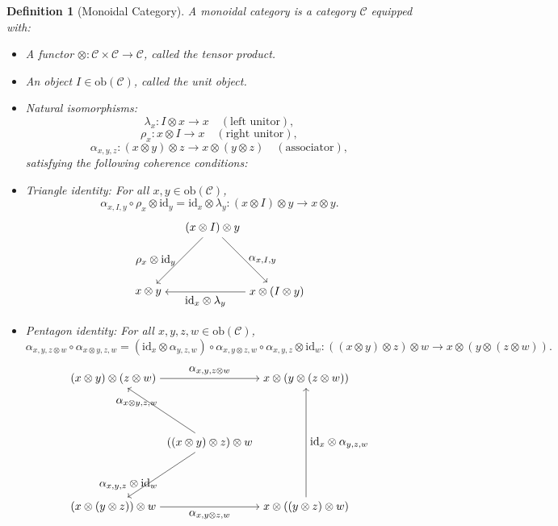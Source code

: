 \documentclass{article}
\theoremstyle{plain}
\newtheorem{definition}[theorem]{Definition}
\theoremstyle{remark}
\begin{document}
\begin{definition}[Monoidal Category]
A \emph{monoidal category} is a category $\mathcal{C}$ equipped with:
\begin{itemize}
    \item A functor $\otimes : \mathcal{C} \times \mathcal{C} \to \mathcal{C}$, called the tensor product.
    \item An object $I \in \mathrm{ob}(\mathcal{C})$, called the unit object.
    \item Natural isomorphisms:
    \[
    \lambda_x : I \otimes x \to x \quad (\text{left unitor}),
    \]
    \[
    \rho_x : x \otimes I \to x \quad (\text{right unitor}),
    \]
    \[
    \alpha_{x,y,z} : (x \otimes y) \otimes z \to x \otimes (y \otimes z) \quad (\text{associator}),
    \]
    satisfying the following coherence conditions:
    \item \emph{Triangle identity}: For all $x, y \in \mathrm{ob}(\mathcal{C})$,
    \[
    \alpha_{x,I,y} \circ \rho_x \otimes \mathrm{id}_y = \mathrm{id}_x \otimes \lambda_y : (x \otimes I) \otimes y \to x \otimes y.
    \]
    \[
    \begin{tikzpicture}
        \node (top) at (0,2) {$(x \otimes I) \otimes y$};
        \node (left) at (-2,0) {$x \otimes y$};
        \node (right) at (2,0) {$x \otimes (I \otimes y)$};
        \draw[->] (top) to node[left] {$\rho_x \otimes \mathrm{id}_y$} (left);
        \draw[->] (top) to node[right] {$\alpha_{x,I,y}$} (right);
        \draw[->] (right) to node[below] {$\mathrm{id}_x \otimes \lambda_y$} (left);
    \end{tikzpicture}
    \]
    \item \emph{Pentagon identity}: For all $x, y, z, w \in \mathrm{ob}(\mathcal{C})$,
    \[
    \alpha_{x,y,z \otimes w} \circ \alpha_{x \otimes y,z,w} = (\mathrm{id}_x \otimes \alpha_{y,z,w}) \circ \alpha_{x,y \otimes z,w} \circ \alpha_{x,y,z} \otimes \mathrm{id}_w : ((x \otimes y) \otimes z) \otimes w \to x \otimes (y \otimes (z \otimes w)).
    \]
    \[
    \begin{tikzpicture}
        \node (center) at (0,0) {$((x \otimes y) \otimes z) \otimes w$};
        \node (topleft) at (-3,2) {$(x \otimes y) \otimes (z \otimes w)$};
        \node (topright) at (3,2) {$x \otimes (y \otimes (z \otimes w))$};
        \node (bottomleft) at (-3,-2) {$(x \otimes (y \otimes z)) \otimes w$};
        \node (bottomright) at (3,-2) {$x \otimes ((y \otimes z) \otimes w)$};
        \draw[->] (center) to node[above left] {$\alpha_{x \otimes y,z,w}$} (topleft);
        \draw[->] (center) to node[below left] {$\alpha_{x,y,z} \otimes \mathrm{id}_w$} (bottomleft);
        \draw[->] (topleft) to node[above] {$\alpha_{x,y,z \otimes w}$} (topright);
        \draw[->] (bottomleft) to node[below] {$\alpha_{x,y \otimes z,w}$} (bottomright);
        \draw[->] (bottomright) to node[right] {$\mathrm{id}_x \otimes \alpha_{y,z,w}$} (topright);
    \end{tikzpicture}
    \]
\end{itemize}
\end{definition}
\end{document}
